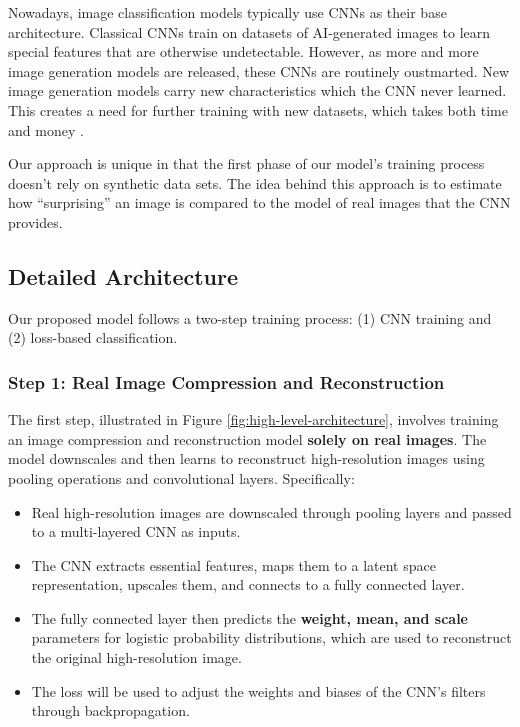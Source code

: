 \documentclass{article} %
\begin{document}
Nowadays, image classification models typically use CNNs as their base architecture. Classical CNNs train on datasets of AI-generated images to learn special features that are otherwise undetectable. However, as more and more image generation models are released, these CNNs are routinely oustmarted. New image generation models carry new characteristics which the CNN never learned. This creates a need for further training with new datasets, which takes both time and money \citep{cozzolino2024zeroshotdetectionaigeneratedimages}.

Our approach is unique in that the first phase of our model's training process doesn't rely on synthetic data sets. The idea behind this approach is to estimate how ``surprising'' an image is compared to the model of real images that the CNN provides.

\subsection{Detailed Architecture}
\label{sec:architecture}

Our proposed model follows a two-step training process: (1) CNN training and (2) loss-based classification.

\subsubsection{Step 1: Real Image Compression and Reconstruction}
The first step, illustrated in Figure \ref{fig:high-level-architecture}, involves training an image compression and reconstruction model \textbf{solely on real images}. The model downscales and then learns to reconstruct high-resolution images using pooling operations and convolutional layers. Specifically:
\begin{itemize}
    \item Real high-resolution images are downscaled through pooling layers and passed to a multi-layered CNN as inputs.
    \item The CNN extracts essential features, maps them to a latent space representation, upscales them, and connects to a fully connected layer.
    \item The fully connected layer then predicts the \textbf{weight, mean, and scale} parameters for logistic probability distributions, which are used to reconstruct the original high-resolution image.
    \item The loss will be used to adjust the weights and biases of the CNN's filters through backpropagation.
\end{itemize}
\end{document}
